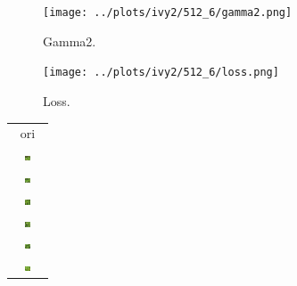 \documentclass[letter]{article}
\begin{document}
\begin{figure}[h!]
	\centering
	\texttt{[image: ../plots/ivy2/512\_6/gamma2.png]}
	\caption{\label{fig:gamma1}Gamma2.}
\end{figure}

\begin{figure}[h!]
	\centering
	\texttt{[image: ../plots/ivy2/512\_6/loss.png]}
	\caption{\label{fig:gamma1}Loss.}
\end{figure}

\newpage

\begin{table}[h!]
	\centering
	\begin{tabular}{c}
		ori\tabularnewline
		\includegraphics[width=0.17\textwidth]{../data/ivy2/512/1} \tabularnewline		\includegraphics[width=0.17\textwidth]{../data/ivy2/512/2} \tabularnewline		\includegraphics[width=0.17\textwidth]{../data/ivy2/512/3} \tabularnewline		\includegraphics[width=0.17\textwidth]{../data/ivy2/512/4} \tabularnewline		\includegraphics[width=0.17\textwidth]{../data/ivy2/512/5} \tabularnewline		\includegraphics[width=0.17\textwidth]{../data/ivy2/512/6} \tabularnewline

\end{tabular}
\end{table}
\end{document}
